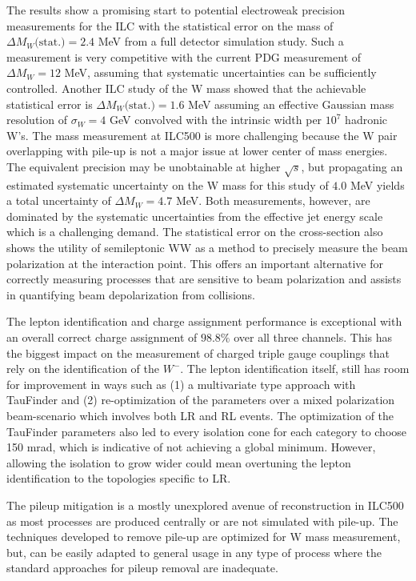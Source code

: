 The results show a promising start to potential electroweak precision measurements for the ILC with the statistical error on the mass of $\Delta M_W\text{(stat.)}= 2.4$ MeV from a full detector simulation study. Such a measurement is very competitive with the current PDG measurement of $\Delta M_W=12$ MeV, assuming that systematic uncertainties can be sufficiently controlled.  Another ILC study of the W mass showed that the achievable statistical error is $\Delta M_W\text{(stat.)} = 1.6$ MeV assuming an effective Gaussian mass resolution of $\sigma_W= 4$ GeV convolved with the intrinsic width per $10^7$ hadronic W's\cite{graham}. The mass measurement at ILC500 is more challenging because the W pair overlapping with pile-up is not a major issue at lower center of mass energies. The equivalent precision may be unobtainable at higher $\sqrt{s}$, but propagating an estimated systematic uncertainty on the W mass for this study of $4.0$ MeV yields a total uncertainty of $\Delta M_W = 4.7$ MeV. Both measurements, however, are dominated by the systematic uncertainties from the effective jet energy scale which is a challenging demand.  The statistical error on the cross-section also shows the utility of semileptonic WW as a method to precisely measure the beam polarization at the interaction point. This offers an important alternative for  correctly measuring processes that are sensitive to beam polarization and assists in quantifying beam depolarization from collisions.

The lepton identification and charge assignment performance is exceptional with an overall correct charge assignment of $98.8\%$ over all three channels. This has the biggest impact on the measurement of charged triple gauge couplings that rely on the identification of the $W^-$. The lepton identification itself, still has room for improvement in ways such as (1) a multivariate type approach with TauFinder and (2) re-optimization of the parameters over a mixed polarization beam-scenario which involves both LR and RL events.  The optimization of the TauFinder parameters also led to every isolation cone for each category to choose 150 mrad, which is indicative of not achieving a global minimum. However, allowing the isolation to grow wider could mean overtuning the lepton identification to the topologies specific to LR. 

The pileup mitigation is a mostly unexplored avenue of reconstruction in ILC500 as most processes are produced centrally or are not simulated with pile-up. The techniques developed to remove pile-up are optimized for W mass measurement, but, can be easily adapted to general usage in any type of process where the standard approaches for pileup removal are inadequate. 

